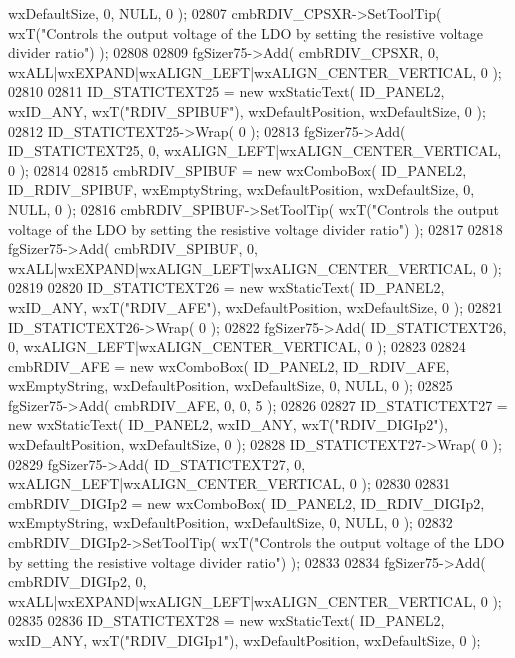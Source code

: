 \begin{DoxyCode}
      wxDefaultSize, 0, NULL, 0 ); 
02807     cmbRDIV_CPSXR->SetToolTip( wxT(\textcolor{stringliteral}{"Controls the output voltage of the LDO by setting the resistive voltage
       divider ratio"}) );
02808     
02809     fgSizer75->Add( cmbRDIV_CPSXR, 0, wxALL|wxEXPAND|wxALIGN\_LEFT|wxALIGN\_CENTER\_VERTICAL, 0 );
02810     
02811     ID_STATICTEXT25 = \textcolor{keyword}{new} wxStaticText( ID_PANEL2, wxID\_ANY, wxT(\textcolor{stringliteral}{"RDIV\_SPIBUF"}), wxDefaultPosition, 
      wxDefaultSize, 0 );
02812     ID_STATICTEXT25->Wrap( 0 );
02813     fgSizer75->Add( ID_STATICTEXT25, 0, wxALIGN\_LEFT|wxALIGN\_CENTER\_VERTICAL, 0 );
02814     
02815     cmbRDIV_SPIBUF = \textcolor{keyword}{new} wxComboBox( ID_PANEL2, ID_RDIV_SPIBUF, wxEmptyString, wxDefaultPosition, 
      wxDefaultSize, 0, NULL, 0 ); 
02816     cmbRDIV_SPIBUF->SetToolTip( wxT(\textcolor{stringliteral}{"Controls the output voltage of the LDO by setting the resistive
       voltage divider ratio"}) );
02817     
02818     fgSizer75->Add( cmbRDIV_SPIBUF, 0, wxALL|wxEXPAND|wxALIGN\_LEFT|wxALIGN\_CENTER\_VERTICAL, 0 );
02819     
02820     ID_STATICTEXT26 = \textcolor{keyword}{new} wxStaticText( ID_PANEL2, wxID\_ANY, wxT(\textcolor{stringliteral}{"RDIV\_AFE"}), wxDefaultPosition, 
      wxDefaultSize, 0 );
02821     ID_STATICTEXT26->Wrap( 0 );
02822     fgSizer75->Add( ID_STATICTEXT26, 0, wxALIGN\_LEFT|wxALIGN\_CENTER\_VERTICAL, 0 );
02823     
02824     cmbRDIV_AFE = \textcolor{keyword}{new} wxComboBox( ID_PANEL2, ID_RDIV_AFE, wxEmptyString, wxDefaultPosition, wxDefaultSize, 
      0, NULL, 0 ); 
02825     fgSizer75->Add( cmbRDIV_AFE, 0, 0, 5 );
02826     
02827     ID_STATICTEXT27 = \textcolor{keyword}{new} wxStaticText( ID_PANEL2, wxID\_ANY, wxT(\textcolor{stringliteral}{"RDIV\_DIGIp2"}), wxDefaultPosition, 
      wxDefaultSize, 0 );
02828     ID_STATICTEXT27->Wrap( 0 );
02829     fgSizer75->Add( ID_STATICTEXT27, 0, wxALIGN\_LEFT|wxALIGN\_CENTER\_VERTICAL, 0 );
02830     
02831     cmbRDIV_DIGIp2 = \textcolor{keyword}{new} wxComboBox( ID_PANEL2, ID_RDIV_DIGIp2, wxEmptyString, wxDefaultPosition, 
      wxDefaultSize, 0, NULL, 0 ); 
02832     cmbRDIV_DIGIp2->SetToolTip( wxT(\textcolor{stringliteral}{"Controls the output voltage of the LDO by setting the resistive
       voltage divider ratio"}) );
02833     
02834     fgSizer75->Add( cmbRDIV_DIGIp2, 0, wxALL|wxEXPAND|wxALIGN\_LEFT|wxALIGN\_CENTER\_VERTICAL, 0 );
02835     
02836     ID_STATICTEXT28 = \textcolor{keyword}{new} wxStaticText( ID_PANEL2, wxID\_ANY, wxT(\textcolor{stringliteral}{"RDIV\_DIGIp1"}), wxDefaultPosition, 
      wxDefaultSize, 0 );

\end{DoxyCode}
